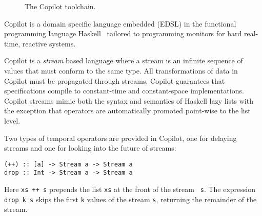 \begin{figure}[ht!]
{
}
        \caption{The Copilot toolchain.}
        \label{fig:toolchain}
        \end{figure}

Copilot is a domain specific language  embedded (EDSL) in the functional
programming language Haskell~\cite{Haskell98}   tailored to
programming monitors for hard real-time, reactive systems.

Copilot is a \emph{stream} based language where a stream is an infinite sequence of values that must conform to the same type.  All transformations of
data in Copilot must be propagated through streams. Copilot
guarantees that specifications compile to constant-time and constant-space
implementations. Copilot streams mimic both the syntax and semantics of
Haskell lazy lists with the exception that  operators are
automatically promoted point-wise to the list level.

Two types of temporal operators are provided in Copilot, one for
delaying streams and one for looking into the future of streams:
\begin{lstlisting}[frame=single]
(++) :: [a] -> Stream a -> Stream a
drop :: Int -> Stream a -> Stream a
\end{lstlisting}
%
Here {\tt xs ++ s} prepends the list {\tt xs} at the front of the stream {\tt
  s}.  The expression {\tt drop k s} skips the first {\tt k} values of the
stream {\tt s}, returning the remainder of the stream.



